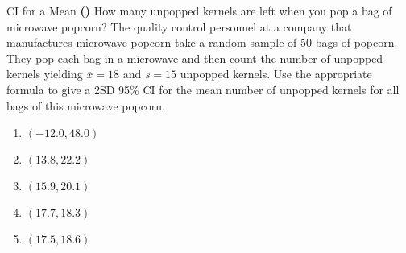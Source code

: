 \documentclass[13pt]{beamer}
\newcounter{count}
\newcommand{\question}{\textbf{(\decimal{count})} \stepcounter{count}}
\begin{document}

\begin{frame}{CI for a Mean}
\question How many unpopped kernels are left when you pop a bag of microwave popcorn? The quality control personnel at a company that manufactures microwave popcorn take a random sample of 50 bags of popcorn. They pop each bag in a microwave and then count the number of unpopped kernels yielding $\overline{x}=18$ and $s=15$ unpopped kernels. Use the appropriate formula to give a 2SD 95\% CI for the mean number of unpopped kernels for all bags of this microwave popcorn.
\begin{enumerate}[A]
   \item $(-12.0, 48.0)$%
   \item $(13.8, 22.2)$%
   \item $(15.9, 20.1)$%
   \item $(17.7, 18.3)$%
   \item $(17.5, 18.6)$%
\end{enumerate}
\end{frame}
\end{document}
